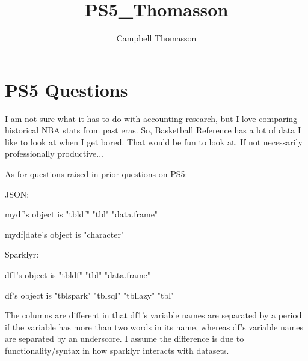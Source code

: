 \documentclass{article}
\title{PS5_Thomasson}
\author{Campbell Thomasson}
\begin{document}
\maketitle

\section{PS5 Questions}

I am not sure what it has to do with accounting research, but I love comparing historical NBA stats from past eras. So, Basketball Reference has a lot of data I like to look at when I get bored. That would be fun to look at. If not necessarily professionally productive...

As for questions raised in prior questions on PS5:

JSON:

mydf's object is "tbldf"     "tbl"        "data.frame"

mydf|date's object is "character"

Sparklyr:

df1's object is "tbldf"     "tbl"        "data.frame"

df's object is "tblspark" "tblsql"   "tbllazy"  "tbl" 

The columns are different in that df1's variable names are separated by a period if the variable has more than two words in its name, whereas df's variable names are separated by an underscore. I assume the difference is due to functionality/syntax in how sparklyr interacts with datasets.
\end{document}
